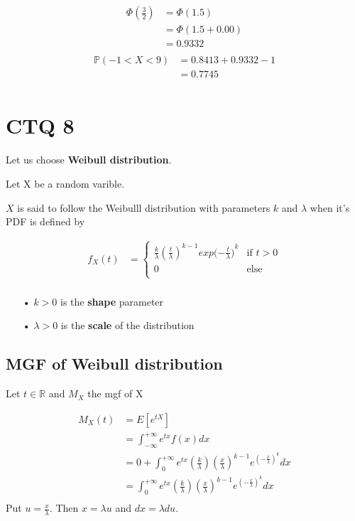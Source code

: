 \documentclass[11pt]{article}
\def\gt{>}
\def\lt{<}
\begin{document}
 \begin{align*}
\Phi(\frac{3}{2})
&=\Phi(1.5)\\
&=\Phi(1.5+0.00)\\
&=0.9332\\   
\end{align*}
 \begin{align*}
\mathbb {P}(-1\lt X\lt 9)
&=0.8413 +0.9332-1\\  
&=0.7745\\  
\end{align*} 

\newpage

\section{CTQ 8}
Let us choose  \textbf{Weibull distribution}.

Let X be a random varible. 

$X$ is said to follow the Weibulll distribution with parameters $k$ and $\lambda$ when it's PDF is defined by

\begin{align*}
f_X(t)  
        &=  \begin{cases}
        \frac{k}{\lambda}{(\frac{t}{\lambda})}^{k-1}exp({-\frac{t}{\lambda})}^{k} & \text{if } t \gt 0 \\
		   0 & \text{else } \\ 
        \end{cases}   \\            
\end{align*}

\begin{itemize}
\item[•]$k \gt 0$ is the \textbf{shape}  parameter
\item[•] $\lambda \gt 0$ is the \textbf{scale} of the distribution
\end{itemize}


\subsection{MGF of Weibull distribution}

Let $t \in \mathbb{R}$ and $M_X$ the mgf of X

\begin{align*}
M_X(t)  
        &=  E[e^{tX}]\\ 
        &= \int_{-\infty}^{+\infty} e^{tx}f(x)dx \\            
             &=0+ \int_{0}^{+\infty} e^{tx}(\frac{k}{\lambda}){(\frac{x}{\lambda})}^{k-1}e^{(-\frac{x}{\lambda})^{k}}dx \\
             &=\int_{0}^{+\infty} e^{tx}(\frac{k}{\lambda}){(\frac{x}{\lambda})}^{k-1}e^{(-\frac{x}{\lambda})^{k}}dx \\
\end{align*}
Put $u=\frac{x}{\lambda}$. Then $x=\lambda u$ and $dx=\lambda du$.
\end{document}
